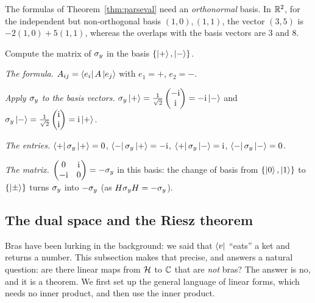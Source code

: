 \begin{pitfall}
  The formulas of Theorem~\ref{thm:parseval} need an \emph{orthonormal} basis. In $\mathbb{R}^2$, for the independent but non-orthogonal basis $(1,0),(1,1)$, the vector $(3,5)$ is $-2(1,0)+5(1,1)$, whereas the overlaps with the basis vectors are $3$ and $8$.
\end{pitfall}

\begin{example}\label{ex:matrix-elements}
  Compute the matrix of $\sigma_y$ in the basis $\{\left|+\right\rangle,\left|-\right\rangle\}$.
\end{example}
\begin{solution}
  \begin{steps}
    \item \emph{The formula.} $A_{ij}=\left\langle e_i\right|A\left|e_j\right\rangle$ with $e_1=+$, $e_2=-$.
    \item \emph{Apply $\sigma_y$ to the basis vectors.} $\sigma_y\left|+\right\rangle=\tfrac1{\sqrt2}\begin{pmatrix}-\mathrm{i}\\\mathrm{i}\end{pmatrix}=-\mathrm{i}\left|-\right\rangle$ and $\sigma_y\left|-\right\rangle=\tfrac1{\sqrt2}\begin{pmatrix}\mathrm{i}\\\mathrm{i}\end{pmatrix}=\mathrm{i}\left|+\right\rangle$.
    \item \emph{The entries.} $\left\langle+\right|\sigma_y\left|+\right\rangle=0$, $\left\langle-\right|\sigma_y\left|+\right\rangle=-\mathrm{i}$, $\left\langle+\right|\sigma_y\left|-\right\rangle=\mathrm{i}$, $\left\langle-\right|\sigma_y\left|-\right\rangle=0$.
    \item \emph{The matrix.} $\begin{pmatrix}0&\mathrm{i}\\-\mathrm{i}&0\end{pmatrix}=-\sigma_y$ in this basis: the change of basis from $\{\left|0\right\rangle,\left|1\right\rangle\}$ to $\{\left|\pm\right\rangle\}$ turns $\sigma_y$ into $-\sigma_y$ (as $H\sigma_y H=-\sigma_y$).
  \end{steps}
\end{solution}

\subsection{The dual space and the Riesz theorem}\label{sec:dual}

Bras have been lurking in the background: we said that $\left\langle v\right|$ ``eats'' a ket and returns a number. This subsection makes that precise, and answers a natural question: are there linear maps from $\mathcal{H}$ to $\mathbb{C}$ that are \emph{not} bras? The answer is no, and it is a theorem. We first set up the general language of linear forms, which needs no inner product, and then use the inner product.

